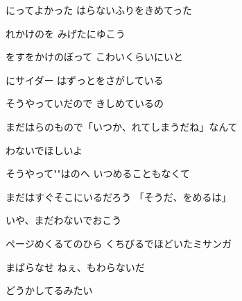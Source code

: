 \documentclass[14pt]{ltjsarticle}
\begin{document}
{\item
  にってよかった はらないふりをきめてった
  \jisho{}

  れかけのを みげたにゆこう
  \jisho{}

\item
  をすをかけのぼって こわいくらいにいと
  \jisho{}

  にサイダー はずっとをさがしている
  \jisho{}

\item
  そうやっていだので きしめているの
  \jisho{}

  まだはらのもので「いつか、れてしまうだね」なんて
  \jisho{}

  わないでほしいよ
  \jisho{}

\item
  そうやって""はのへ いつめることもなくて
  \jisho{}

  まだはすぐそこにいるだろう 「そうだ、をめるは」
  \jisho{}

  いや、まだわないでおこう
  \jisho{}

\item
  ページめくるてのひら くちびるでほどいたミサンガ
  \jisho{}

  まばらなせ ねぇ、もわらないだ
  \jisho{}

\item
  どうかしてるみたい
  \jisho{}

  
}
\end{document}

